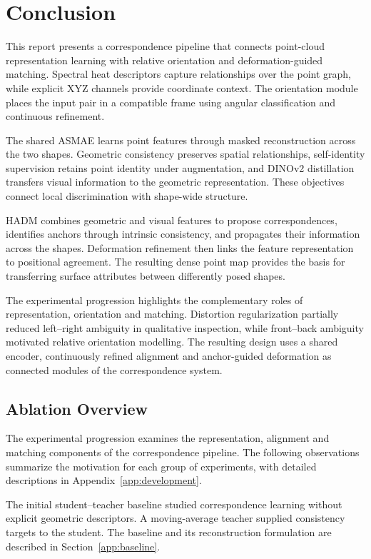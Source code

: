\chapter{Conclusion}
\label{Chapter5}

This report presents a correspondence pipeline that connects point-cloud representation learning with relative orientation and deformation-guided matching. Spectral heat descriptors capture relationships over the point graph, while explicit XYZ channels provide coordinate context. The orientation module places the input pair in a compatible frame using angular classification and continuous refinement.

The shared ASMAE learns point features through masked reconstruction across the two shapes. Geometric consistency preserves spatial relationships, self-identity supervision retains point identity under augmentation, and DINOv2 distillation transfers visual information to the geometric representation. These objectives connect local discrimination with shape-wide structure.

HADM combines geometric and visual features to propose correspondences, identifies anchors through intrinsic consistency, and propagates their information across the shapes. Deformation refinement then links the feature representation to positional agreement. The resulting dense point map provides the basis for transferring surface attributes between differently posed shapes.

The experimental progression highlights the complementary roles of representation, orientation and matching. Distortion regularization partially reduced left--right ambiguity in qualitative inspection, while front--back ambiguity motivated relative orientation modelling. The resulting design uses a shared encoder, continuously refined alignment and anchor-guided deformation as connected modules of the correspondence system.

\section{Ablation Overview}
\label{sec:ablation-overview}
The experimental progression examines the representation, alignment and matching components of the correspondence pipeline. The following observations summarize the motivation for each group of experiments, with detailed descriptions in Appendix~\ref{app:development}.

The initial student--teacher baseline studied correspondence learning without explicit geometric descriptors. A moving-average teacher supplied consistency targets to the student. The baseline and its reconstruction formulation are described in Section~\ref{app:baseline}.


